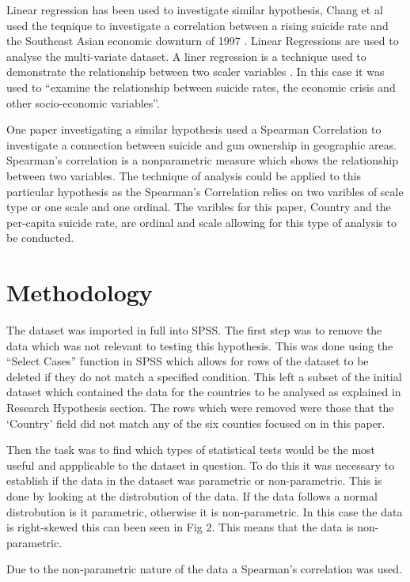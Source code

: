 \documentclass[conference]{IEEEtran}
\begin{document}
Linear regression has been used to investigate similar hypothesis, Chang et al used the teqnique to investigate a 
correlation between a rising suicide rate and the Southeast Asian economic downturn of 1997 \cite{SEAsia_sui}.
Linear Regressions are used to analyse the multi-variate dataset. A liner regression is a technique used to demonstrate the relationship between two scaler variables \cite{stats_models_book}. 
In this case it was used to ``examine the relationship between suicide rates, the economic crisis and other socio-economic variables''\cite{SEAsia_sui}.

One paper investigating a similar hypothesis used a Spearman Correlation to investigate a connection between suicide and gun ownership in geographic areas.
Spearman's correlation is a nonparametric measure which shows the relationship between two variables\cite{gun_sui}.
The technique of analysis could be applied to this particular hypothesis as the Spearman's Correlation relies on two varibles of scale type or one scale and one ordinal.
The varibles for this paper, Country and the per-capita suicide rate, are ordinal and scale allowing for this type of analysis to be conducted.

\section{Methodology}
The dataset was imported in full into SPSS. The first step was to remove the data which was not relevant to testing this hypothesis.
This was done using the ``Select Cases'' function in SPSS which allows for rows of the dataset to be deleted if they do not match a specified condition.
This left a subset of the initial dataset which contained the data for the countries to be analysed as explained in Research Hypothesis section.
The rows which were removed were those that the `Country' field did not match any of the six counties focused on in this paper.

Then the task was to find which types of statistical tests would be the most useful and appplicable to the dataset in question.
To do this it was necessary to establish if the data in the dataset was parametric or non-parametric.
This is done by looking at the distrobution of the data. If the data follows a normal distrobution is it parametric, otherwise it is non-parametric.
In this case the data is right-skewed this can been seen in Fig 2. This means that the data is non-parametric.

Due to the non-parametric nature of the data a Spearman's correlation was used.
\end{document}
